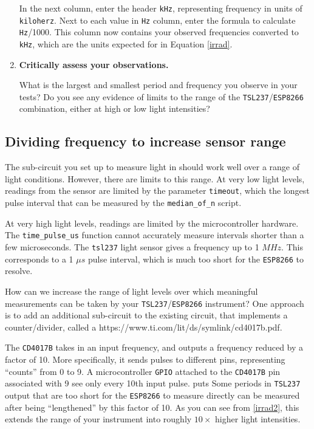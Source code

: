 \begin{enumerate}[resume]
	\smallskip
	In the next column, enter the header \texttt{kHz}, representing frequency in units of \texttt{kiloherz}.
	Next to each value in \texttt{Hz} column, enter the formula to calculate \texttt{Hz}/1000.
	This column now contains your observed frequencies converted to \texttt{kHz}, which are the units expected for in Equation \ref{irrad}.
	
	\item \textbf{Critically assess your observations.}
	
	What is the largest and smallest period and frequency you observe in your tests?
	Do you see any evidence of limits to the range of the \texttt{TSL237}/\texttt{ESP8266} combination, either at high or low light intensities?
\end{enumerate}


\subsection{Dividing frequency to increase sensor range}
The sub-circuit you set up to measure light in  should work well over a range of light conditions. 
However, there are limits to this range.
At very low light levels, readings from the sensor are limited by the parameter \texttt{timeout}, which the longest pulse interval that can be measured by the \lstinline{median_of_n} script.

At very high light levels, readings are limited by the microcontroller hardware.
The \lstinline{time_pulse_us} function cannot accurately measure intervals shorter than a few microseconds.
The \texttt{tsl237} light sensor gives a frequency up to 1 $MHz$.
This corresponds to a 1 $\mu s$ pulse interval, which is much too short for the \texttt{ESP8266} to resolve. 

How can we increase the range of light levels over which meaningful measurements can be taken by your \texttt{TSL237}/\texttt{ESP8266} instrument?
One approach is to add an additional sub-circuit to the existing circuit, that implements a counter/divider, called a  {https://www.ti.com/lit/ds/symlink/cd4017b.pdf}.

The \texttt{CD4017B} takes in an input frequency, and outputs a frequency reduced by a factor of 10.
More specifically, it sends pulses to different pins, representing ``counts'' from 0 to 9. 
A microcontroller \texttt{GPIO} attached to the \texttt{CD4017B} pin associated with 9 see only every 10th input pulse. puts 
Some periods in \texttt{TSL237} output that are too short for the \texttt{ESP8266} to measure directly can be measured after being ``lengthened'' by  this factor of 10. 
As you can see from \ref{irrad2}, this extends the range of your instrument into roughly $10\times$ higher light intensities. 

